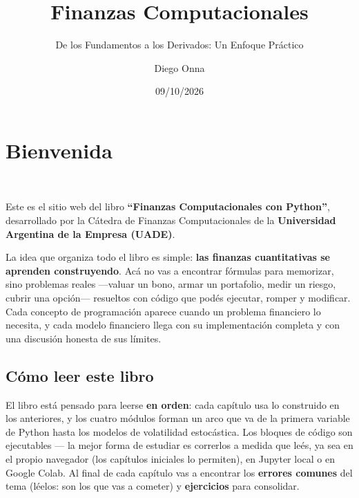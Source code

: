 \documentclass[
  spanish,
  letterpaper,
  DIV=11,
  numbers=noendperiod]{scrreprt}
\title{Finanzas Computacionales}
\subtitle{De los Fundamentos a los Derivados: Un Enfoque Práctico}
\author{Diego Onna}
\date{09/10/2026}
\renewcommand*\contentsname{Tabla de contenidos}
\newcommand\contentsname{Tabla de contenidos}
\begin{document}
\maketitle

\renewcommand*\contentsname{Tabla de contenidos}
{
\hypersetup{linkcolor=}
\setcounter{tocdepth}{1}
\tableofcontents
}


\chapter*{Bienvenida}\label{bienvenida}


\href{https://github.com/diegoonna}{} ~
\href{https://www.linkedin.com/in/diego-onna}{} ~
\href{https://scholar.google.com/citations?user=9MFIqsoAAAAJ}{}

Este es el sitio web del libro \textbf{``Finanzas Computacionales con
Python''}, desarrollado por la Cátedra de Finanzas Computacionales de la
\textbf{Universidad Argentina de la Empresa (UADE)}.

La idea que organiza todo el libro es simple: \textbf{las finanzas
cuantitativas se aprenden construyendo}. Acá no vas a encontrar fórmulas
para memorizar, sino problemas reales ---valuar un bono, armar un
portafolio, medir un riesgo, cubrir una opción--- resueltos con código
que podés ejecutar, romper y modificar. Cada concepto de programación
aparece cuando un problema financiero lo necesita, y cada modelo
financiero llega con su implementación completa y con una discusión
honesta de sus límites.

\section*{Cómo leer este libro}\label{cuxf3mo-leer-este-libro}


El libro está pensado para leerse \textbf{en orden}: cada capítulo usa
lo construido en los anteriores, y los cuatro módulos forman un arco que
va de la primera variable de Python hasta los modelos de volatilidad
estocástica. Los bloques de código son ejecutables --- la mejor forma de
estudiar es correrlos a medida que leés, ya sea en el propio navegador
(los capítulos iniciales lo permiten), en Jupyter local o en Google
Colab. Al final de cada capítulo vas a encontrar los \textbf{errores
comunes} del tema (léelos: son los que vas a cometer) y
\textbf{ejercicios} para consolidar.
\end{document}
